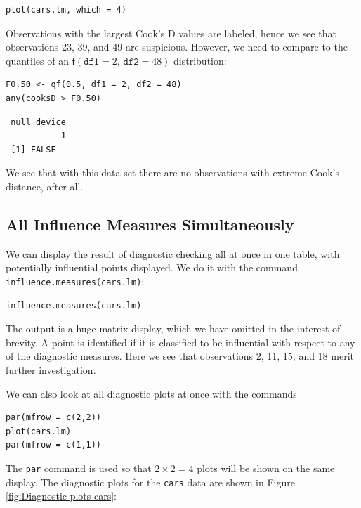 \documentclass[captions=tableheading]{scrbook}
\begin{document}
\begin{verbatim}
plot(cars.lm, which = 4)
\end{verbatim}

Observations with the largest Cook's D values are labeled, hence we see that observations 23, 39, and 49 are suspicious. However, we need to compare to the quantiles of an \( \mathsf{f}(\mathtt{df1} = 2, \, \mathtt{df2} = 48) \) distribution:


\begin{verbatim}
F0.50 <- qf(0.5, df1 = 2, df2 = 48)
any(cooksD > F0.50)
\end{verbatim}

\begin{verbatim}
 null device 
           1
 [1] FALSE
\end{verbatim}

We see that with this data set there are no observations with extreme Cook's distance, after all.
\subsection{All Influence Measures Simultaneously}
\label{sec-1-5-5}


We can display the result of diagnostic checking all at once in one table, with potentially influential points displayed. We do it with the command \texttt{influence.measures(cars.lm)}:


\begin{verbatim}
influence.measures(cars.lm)
\end{verbatim}

The output is a huge matrix display, which we have omitted in the interest of brevity. A point is identified if it is classified to be influential with respect to any of the diagnostic measures. Here we see that observations 2, 11, 15, and 18 merit further investigation.  

We can also look at all diagnostic plots at once with the commands


\begin{verbatim}
par(mfrow = c(2,2))
plot(cars.lm)
par(mfrow = c(1,1))
\end{verbatim}

The \texttt{par} command is used so that \(2\times 2 = 4\) plots will be shown on the same display. The diagnostic plots for the \texttt{cars} data are shown in Figure \ref{fig:Diagnostic-plots-cars}:
\end{document}
